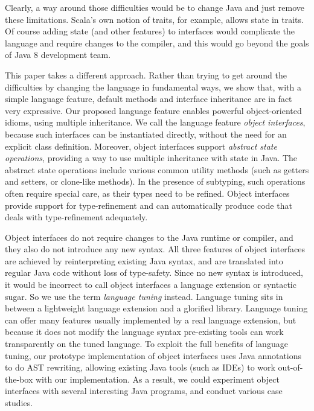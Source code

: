 \noindent Clearly, a way around those difficulties would be to
change Java and just remove these limitations. Scala's own
notion of traits, for example, allows state in traits. Of course adding
state (and other features) to interfaces would complicate the language
and require changes to the compiler, and this would go beyond the
goals of Java 8 development team.

This paper takes a different approach. Rather than trying to get
around the difficulties by changing the language in fundamental ways,
we show that, with a simple language feature, default methods and
interface inheritance are in fact very expressive. Our proposed
language feature enables powerful object-oriented idioms, using
multiple inheritance. We call the language feature \emph{object
  interfaces}, because such interfaces can be instantiated directly,
without the need for an explicit class definition. Moreover, object
interfaces support \emph{abstract state operations}, providing a way
to use multiple inheritance with state in Java. The abstract state
operations include various common utility methods (such as getters and
setters, or clone-like methods). In the presence of subtyping, such
operations often require special care, as their types need to be
refined. Object interfaces provide support for type-refinement and can
automatically produce code that deals with type-refinement
adequately. %

Object interfaces do not require changes to the Java runtime or compiler, 
and they also do not introduce any new syntax. All three features of object interfaces are
achieved by reinterpreting existing Java syntax, and are translated
into regular Java code without loss of type-safety. Since no new
syntax is introduced, it would be incorrect to call object interfaces
a language extension or syntactic sugar. So we use the term
\emph{language tuning} instead. Language tuning sits in between a
lightweight language extension and a glorified library. Language
tuning can offer many features usually implemented by a real language
extension, but because it does not modify the language syntax
pre-existing tools can work transparently on the tuned language.  To
exploit the full benefits of language tuning, our prototype
implementation of object interfaces uses Java annotations to do AST
rewriting, allowing existing Java tools (such as IDEs) to work
out-of-the-box with our implementation. As a result, we could
experiment object interfaces with several interesting Java programs,
and conduct various case studies.

